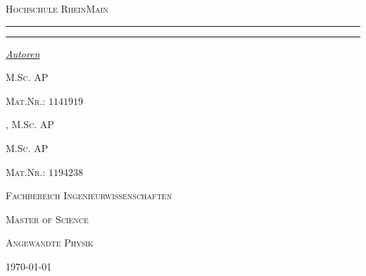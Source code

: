 \begin{titlepage}
	\newcommand{\HRule}{\rule{\linewidth}{0.5mm}}
	\centering
	\textsc{\Large Hochschule RheinMain} \par

	\begin{center}
		
	\end{center}
	\textsc{\LARGE \titleLV}\vspace{0.5cm}
	\HRule\vspace{0.6cm}
	{\huge\bfseries \subtitleA}\par\vspace{0.4cm} %
	{\huge\bfseries \subtitleB}\par\vspace{0.4cm}
	\HRule\vspace{1.5cm}
	\begin{minipage}{0.4\textwidth}
		\centering
		\Large
		\textit{\underline{Autoren}}\par\vspace{0.5cm}
		\textsc{\nameA}\par\vspace{0.25cm}
		\large
		\textsc{M.Sc. AP}\par\vspace{0.25cm}
		\textsc{Mat.Nr.: \(1141919\)}\par\vspace{.5cm}
		\Large
		\textsc{\nameB, M.Sc. AP}\par\vspace{0.25cm}
		\large
		\textsc{M.Sc. AP}\par\vspace{0.25cm}
		\textsc{Mat.Nr.: \(1194238\)}\par\vspace{2cm}
	\end{minipage}
	\vfill\vfill\vfill
	\textsc{\Large Fachbereich Ingenieurwissenschaften}\par\vspace{0.5cm}\par
	\textsc{\large Master of Science}\par\vspace{0.5cm}
	\textsc{\large Angewandte Physik}\par\vspace{0.2cm}
	\vfill
	\begin{center}
		{\large\today}
	\end{center}
\end{titlepage}